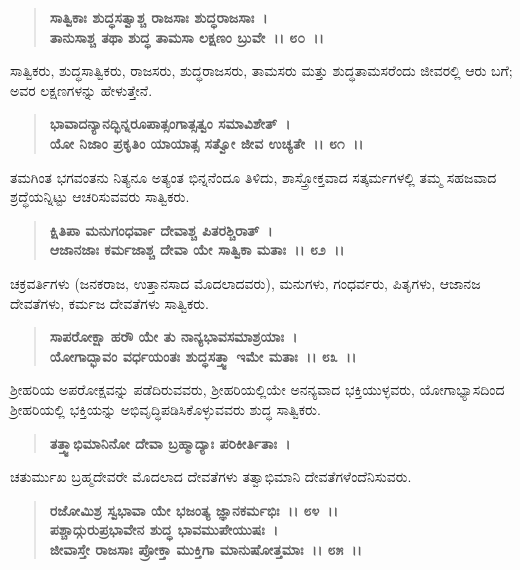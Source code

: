 \begin{verse}
\textbf{ಸಾತ್ವಿಕಾಃ ಶುದ್ಧಸತ್ವಾಶ್ಚ ರಾಜಸಾಃ ಶುದ್ಧರಾಜಸಾಃ~।}\\\textbf{ತಾನುಸಾಶ್ಚ ತಥಾ ಶುದ್ಧ ತಾಮಸಾ ಲಕ್ಷಣಂ ಬ್ರುವೇ~।। ೮೦~।।}
\end{verse}

ಸಾತ್ವಿಕರು, ಶುದ್ಧಸಾತ್ವಿಕರು, ರಾಜಸರು, ಶುದ್ಧರಾಜಸರು, ತಾಮಸರು ಮತ್ತು ಶುದ್ಧತಾಮಸರೆಂದು ಜೀವರಲ್ಲಿ ಆರು ಬಗೆ; ಅವರ ಲಕ್ಷಣಗಳನ್ನು ಹೇಳುತ್ತೇನೆ.

\begin{verse}
\textbf{ಭಾವಾದನ್ಯಾನದ್ಭಿನ್ನರೂಪಾತ್ಸಂಗಾತ್ಸತ್ವಂ ಸಮಾವಿಶೇತ್~।}\\\textbf{ಯೋ ನಿಜಾಂ ಪ್ರಕೃತಿಂ ಯಾಯಾತ್ಸ ಸತ್ವೋ ಜೀವ ಉಚ್ಯತೇ~।। ೮೧~।।}
\end{verse}

ತಮಗಿಂತ ಭಗವಂತನು ನಿತ್ಯನೂ ಅತ್ಯಂತ ಭಿನ್ನನೆಂದೂ ತಿಳಿದು, ಶಾಸ್ತ್ರೋಕ್ತವಾದ ಸತ್ಕರ್ಮಗಳಲ್ಲಿ ತಮ್ಮ ಸಹಜವಾದ ಶ್ರದ್ಧೆಯನ್ನಿಟ್ಟು ಆಚರಿಸುವವರು ಸಾತ್ವಿಕರು.

\begin{verse}
\textbf{ಕ್ಷಿತಿಪಾ ಮನುಗಂಧರ್ವಾ ದೇವಾಶ್ಚ ಪಿತರಶ್ಚಿರಾತ್~।}\\\textbf{ಆಜಾನಜಾಃ ಕರ್ಮಜಾಶ್ಚ ದೇವಾ ಯೇ ಸಾತ್ವಿಕಾ ಮತಾಃ~।। ೮೨~।।}
\end{verse}

ಚಕ್ರವರ್ತಿಗಳು (ಜನಕರಾಜ, ಉತ್ತಾನಸಾದ ಮೊದಲಾದವರು), ಮನುಗಳು, ಗಂಧ\-ರ್ವರು, ಪಿತೃಗಳು, ಆಜಾನಜ ದೇವತೆಗಳು, ಕರ್ಮಜ ದೇವತೆಗಳು ಸಾತ್ವಿಕರು.

\begin{verse}
\textbf{ಸಾಪರೋಕ್ಷಾ ಹ‌ರೌ ಯೇ ತು ನಾನ್ಯಭಾವಸಮಾಶ್ರಯಾಃ~।}\\\textbf{ಯೋಗಾದ್ಭಾವಂ ವರ್ಧಯಂತಃ ಶುದ್ಧಸತ್ತ್ವಾ ಇಮೇ ಮತಾಃ~।। ೮೩~।।}
\end{verse}

ಶ‍್ರೀಹರಿಯ ಅಪರೋಕ್ಷವನ್ನು ಪಡೆದಿರುವವರು, ಶ‍್ರೀಹರಿಯಲ್ಲಿಯೇ ಅನನ್ಯವಾದ ಭಕ್ತಿಯುಳ್ಳವರು, ಯೋಗಾಭ್ಯಾಸದಿಂದ ಶ‍್ರೀಹರಿಯಲ್ಲಿ ಭಕ್ತಿಯನ್ನು ಅಭಿವೃದ್ಧಿಪಡಿಸಿಕೊಳ್ಳುವವರು ಶುದ್ಧ ಸಾತ್ವಿಕರು.

\begin{verse}
\textbf{ತತ್ತ್ವಾಭಿಮಾನಿನೋ ದೇವಾ ಬ್ರಹ್ಮಾದ್ಯಾಃ ಪರಿಕೀರ್ತಿತಾಃ~।}
\end{verse}

ಚತುರ್ಮುಖ ಬ್ರಹ್ಮದೇವರೇ ಮೊದಲಾದ ದೇವತೆಗಳು ತತ್ವಾಭಿಮಾನಿ ದೇವತೆಗಳೆಂದೆನಿಸುವರು.

\begin{verse}
\textbf{ರಜೋಮಿಶ್ರ ಸ್ವಭಾವಾ ಯೇ ಭಜಂತ್ಯ ಜ್ಞಾನಕರ್ಮಭಿಃ~।। ೮೪~।।}\\\textbf{ಪಶ್ಚಾದ್ಗುರುಪ್ರಭಾವೇನ ಶುದ್ಧ ಭಾವಮುಪೇಯುಷಃ~। }\\\textbf{ಜೀವಾಸ್ತೇ ರಾಜಸಾಃ ಪ್ರೋಕ್ತಾ ಮುಕ್ತಿಗಾ ಮಾನುಷೋತ್ತಮಾಃ~।। ೮೫~।।}
\end{verse}


